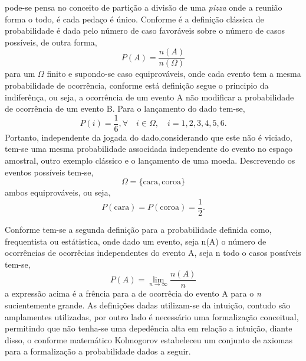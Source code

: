 pode-se pensa no conceito de parti\c{c}\~{a}o a divis\~{a}o de uma \textit{pizza} onde a reuni\~{a}o forma o todo, \'{e} cada peda\c{c}o
\'{e} \'{u}nico. 
Conforme  \cite{james} \'{e} \cite{magalhaes} a defini\c{c}\~{a}o cl\'{a}ssica de probabilidade \'{e} dada pelo n\'{u}mero de caso favor\'{a}veis
sobre o n\'{u}mero de casos poss\'{i}veis, de outra forma,
$$ P(A) = \frac{n(A)}{n(\Omega)} $$
para um $\Omega$ finito e supondo-se caso equiprov\'{a}veis, onde cada evento tem a mesma probabilidade de ocorr\^{e}ncia, conforme
\cite{james} est\'{a} defini\c{c}\~{a}o segue o principio da indifer\^{e}n\c{c}a, ou seja, a ocorr\^{e}ncia de um evento A n\~{a}o 
modificar a probabilidade de ocorr\^{e}ncia de um evento B. Para o lan\c{c}amento do dado tem-se,
  \begin{equation*}
	P(i) = \frac{1}{6},\forall \quad i \in \Omega, \quad i = 1,2,3,4,5,6.	
  \end{equation*}
Portanto, independente da jogada do dado,considerando que este n\~{a}o \'{e} viciado, tem-se uma mesma probabilidade associdada
independente do evento no espa\c{c}o amostral, outro exemplo cl\'{a}ssico e o lan\c{c}amento de uma moeda. Descrevendo os eventos poss\'{i}veis
tem-se,
$$\Omega = \{ \textrm{cara}, \textrm{coroa} \}$$
ambos equiprov\'{a}veis, ou seja,
\begin{equation*}
  P(\textrm{cara}) = P(\textrm{coroa}) = \frac{1}{2}.  
\end{equation*}
\par
Conforme \cite{magalhaes} tem-se a segunda defini\c{c}\~{a}o para a probabilidade definida como, frequentista ou est\'{a}tistica, onde
dado um evento, seja n(A) o n\'{u}mero de ocorr\^{e}ncias de ocorr\^{e}cias independentes do evento A, seja n todo o casos poss\'{i}veis
tem-se,
$$P(A) = \displaystyle\lim_{n \to \infty} \frac{n (A)} {n} $$
a express\~{a}o acima \'{e} a fr\^{e}ncia para a de ocorr\^{e}cia do evento A para o \textit{n} sucientemente grande. As defini\c{c}\~{o}es
dadas utilizam-se da intui\c{c}\~{a}o, contudo s\~{a}o amplamentes utilizadas, por outro lado \'{e} necess\'{a}rio uma formaliza\c{c}\~{a}o
conceitual, permitindo que n\~{a}o tenha-se uma deped\^{e}ncia alta em rela\c{c}\~{a}o a intui\c{c}\~{a}o, diante disso, o
conforme \cite{magalhaes} matem\'{a}tico Kolmogorov estabeleceu um conjunto de axiomas para a formaliza\c{c}\~{a}o a probabilidade dados
a seguir.

\theoremstyle{definition}
\newtheorem{defin}{Defini\c{c}\~{a}o}[section]
\newtheorem{prop}{Proposi\c{c}\~{a}o}[section]
\newtheorem{teo}{Teorema}[section]

